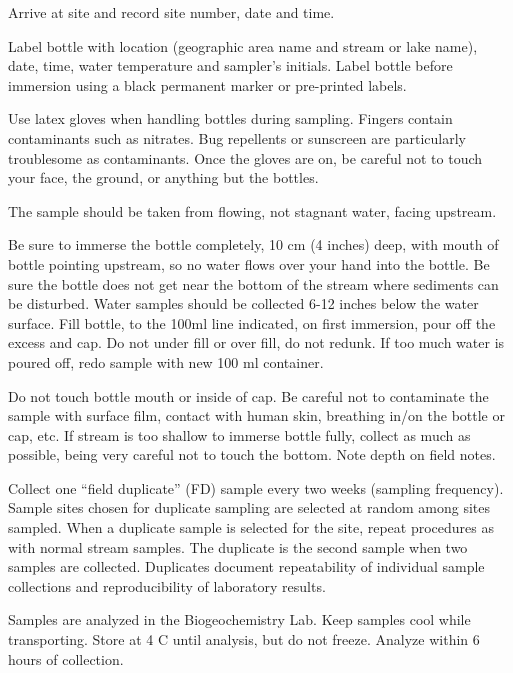 \documentclass[12pt]{../SOP4_alpha}\usepackage[]{graphicx}\usepackage[]{xcolor}
\begin{document}
\NP  Arrive at site and record site number, date and time.


\NP Label bottle with location (geographic area name and stream or lake name),
date, time, water temperature and sampler's initials. Label bottle before
immersion using a black permanent marker or pre-printed labels. 

\NP Use latex gloves when handling bottles during sampling. Fingers contain
contaminants such as nitrates. Bug repellents or sunscreen are particularly 
troublesome as contaminants. Once the gloves are on, be careful not to touch
your face, the ground, or anything but the bottles.

\NP The sample should be taken from flowing, not stagnant water, facing
upstream.

\NP Be sure to immerse the bottle completely, 10 cm (4 inches) deep, with
mouth of bottle pointing upstream, so no water flows over your hand into the
bottle. Be sure the bottle does not get near the bottom of the stream where
sediments can be disturbed. Water samples should be collected 6-12 inches
below the water surface. Fill bottle, to the 100ml line indicated, on first
immersion, pour off the excess and cap. Do not under fill or over fill, do not
redunk. If too much water is poured off, redo sample with new 100 ml
container.

\NP Do not touch bottle mouth or inside of cap. Be careful not to
contaminate the sample with surface film, contact with human skin, breathing
in/on the bottle or cap, etc. If stream is too shallow to immerse bottle fully, collect as much as possible, being very careful not to touch the bottom. Note depth on field notes.

\NP Collect one ``field duplicate'' (FD) sample every two weeks (sampling frequency).
Sample sites chosen for duplicate sampling are selected at random among
sites sampled. When a duplicate sample is selected for the site, repeat
procedures as with normal stream samples. The duplicate is the second
sample when two samples are collected. Duplicates document repeatability of
individual sample collections and reproducibility of laboratory results.

\NP Samples are analyzed in the Biogeochemistry Lab. Keep samples cool
while transporting. Store at 4 \degree C until analysis, but do not freeze. Analyze within 6 hours of collection.
\end{document}
